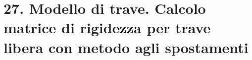 \section{27. Modello di trave. Calcolo matrice di rigidezza per trave libera con metodo agli spostamenti}


